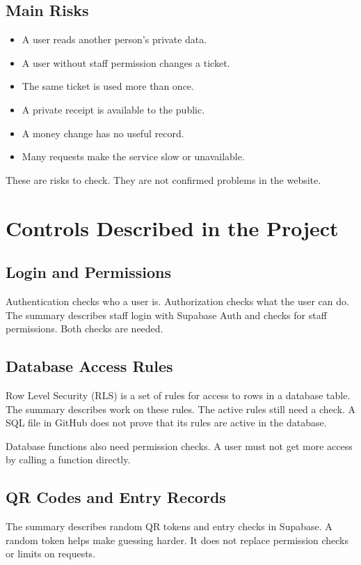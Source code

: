 \documentclass[conference]{IEEEtran}
\begin{document}
\subsection{Main Risks}
\begin{itemize}
\item A user reads another person's private data.
\item A user without staff permission changes a ticket.
\item The same ticket is used more than once.
\item A private receipt is available to the public.
\item A money change has no useful record.
\item Many requests make the service slow or unavailable.
\end{itemize}

These are risks to check. They are not confirmed problems in the website.

\section{Controls Described in the Project}
\subsection{Login and Permissions}
Authentication checks who a user is. Authorization checks what the user can do. The summary describes staff login with Supabase Auth and checks for staff permissions. Both checks are needed.

\subsection{Database Access Rules}
Row Level Security (RLS) is a set of rules for access to rows in a database table. The summary describes work on these rules. The active rules still need a check. A SQL file in GitHub does not prove that its rules are active in the database.

Database functions also need permission checks. A user must not get more access by calling a function directly.

\subsection{QR Codes and Entry Records}
The summary describes random QR tokens and entry checks in Supabase. A random token helps make guessing harder. It does not replace permission checks or limits on requests.
\end{document}
